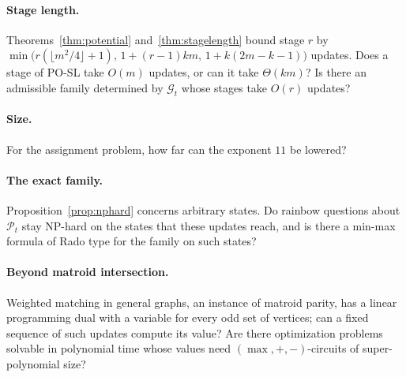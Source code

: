 \documentclass[11pt]{article}
\newcommand{\Pos}{\mathcal P}
\begin{document}
\paragraph{Stage length.}  Theorems~\ref{thm:potential} and~\ref{thm:stagelength}
bound stage $r$ by
$\min\bigl(r(\lfloor m^{2}/4\rfloor+1),\,1+(r-1)km,\,1+k(2m-k-1)\bigr)$ updates.  Does a
stage of PO-SL take $O(m)$ updates, or can it take $\Theta(km)$?  Is there an admissible family determined by $\mathcal G_t$ whose stages
take $O(r)$ updates?

\paragraph{Size.}  For the assignment problem, how far can the exponent $11$
be lowered?

\paragraph{The exact family.}  Proposition~\ref{prop:nphard} concerns
arbitrary states.  Do rainbow questions about $\Pos_t$ stay NP-hard on the
states that these updates reach, and is there a min-max formula of Rado type for
the family on such states?

\paragraph{Beyond matroid intersection.}  Weighted matching in general graphs, an
instance of matroid parity, has a linear programming dual with a variable for
every odd set of vertices; can a fixed sequence of such updates compute its
value?  Are there optimization problems solvable in polynomial time whose values
need $(\max,+,-)$-circuits of super-polynomial size?



\end{document}
